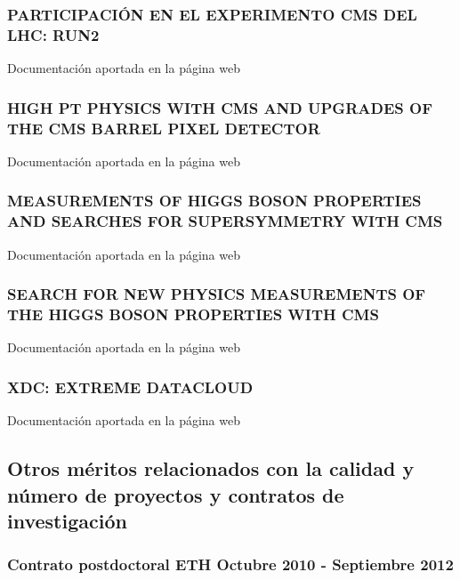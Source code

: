 \documentclass[a4paper, 11pt, twoside, openright]{report}
\begin{document}
\subsubsection{PARTICIPACIÓN EN EL EXPERIMENTO CMS DEL LHC: RUN2}
Documentación aportada en la página web
%

\subsubsection{HIGH PT PHYSICS WITH CMS AND UPGRADES OF THE CMS BARREL PIXEL DETECTOR}
Documentación aportada en la página web
%

\subsubsection{MEASUREMENTS OF HIGGS BOSON PROPERTIES AND SEARCHES FOR SUPERSYMMETRY WITH CMS}
Documentación aportada en la página web
%

\subsubsection{SEARCH FOR NEW PHYSICS MEASUREMENTS OF THE HIGGS BOSON PROPERTIES WITH CMS}
Documentación aportada en la página web
%

\subsubsection{XDC: EXTREME DATACLOUD}
Documentación aportada en la página web
%

\subsection{Otros méritos relacionados con la calidad y número de proyectos y contratos de investigación}

\subsubsection{Contrato postdoctoral ETH Octubre 2010 - Septiembre 2012}

\end{document}
